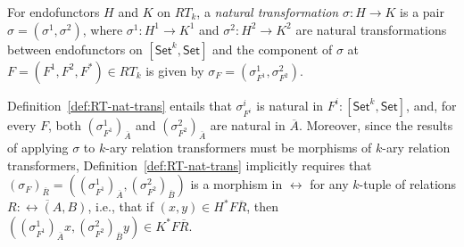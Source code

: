 \documentclass{lmcs}
\theoremstyle{plain}\newtheorem{satz}[thm]{Satz}
\newcommand{\set}{\mathsf{Set}}
\begin{document}
{\begin{defi}\label{def:RT-nat-trans}
For endofunctors $H$ and $K$ on $RT_k$, a {\em natural transformation}
$\sigma : H \to K$ is a pair $\sigma = (\sigma^1, \sigma^2)$, where
$\sigma^1 : H^1 \to K^1$ and $\sigma^2 : H^2 \to K^2$ are natural
transformations between endofunctors on $[\set^k,\set]$ and the
component of $\sigma$ at $F = (F^1,F^2,F^*) \in RT_k$ is given by
$\sigma_F = (\sigma^1_{F^1}, \sigma^2_{F^2})$.
\end{defi}
Definition~\ref{def:RT-nat-trans} entails that $\sigma^i_{F^i}$ is
natural in $F^i : [\set^k,\set]$, and, for every $F$, both
$(\sigma^1_{F^1})_{\overline{A}}$ and
$(\sigma^2_{F^2})_{\overline{A}}$ are natural in $\overline{A}$.
Moreover, since the results of applying $\sigma$ to $k$-ary relation
transformers must be morphisms of $k$-ary relation transformers,
Definition~\ref{def:RT-nat-trans} implicitly requires that
$(\sigma_F)_{\overline{R}} = ( (\sigma^1_{F^1})_{\overline{A}},
(\sigma^2_{F^2})_{\overline{B}})$ is a morphism in $\rel$ for any
$k$-tuple of relations $\overline{R : \rel(A, B)}$, i.e., that if $(x,
y) \in H^*F\overline{R}$, then $((\sigma^1_{F^1})_{\overline{A}} x,
(\sigma^2_{F^2})_{\overline{B}} y) \in K^*F\overline{R}$.

}
\end{document}
